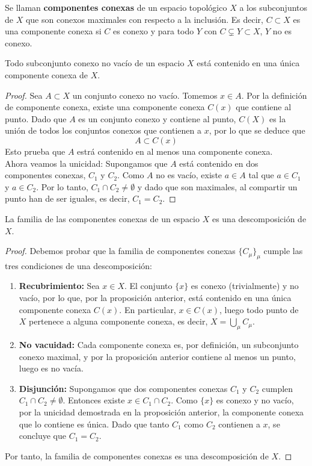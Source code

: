 \begin{definición}
    Se llaman \textbf{componentes conexas} de un espacio topológico $X$ a los subconjuntos de $X$ que son conexos maximales con respecto a la inclusión. Es decir, $C \subset X$ es una componente conexa si $C$ es conexo y para todo $Y$ con $C \subsetneq Y \subset X$, $Y$ no es conexo.
\end{definición}
\begin{proposición}
    Todo subconjunto conexo no vacío de un espacio $X$ está contenido en una única componente conexa de $X$.
\end{proposición}
\begin{proof}
    Sea $A \subset X$ un conjunto conexo no vacío. Tomemos $x \in A$. Por la definición de componente conexa, existe una componente conexa $C(x)$ que contiene al punto. Dado que $A$ es un conjunto conexo y contiene al punto, $C(X)$ es la unión de todos los conjuntos conexos que contienen a $x$, por lo que se deduce que
    $$A \subset C(x)$$
    Esto prueba que $A$ estrá contenido en al menos una componente conexa. \\
    Ahora veamos la unicidad: Supongamos que $A$ está contenido en dos componentes conexas, $C_1$ y $C_2$. Como $A$ no es vacío, existe $a \in A$ tal que $a \in C_1$ y $a \in C_2$. Por lo tanto, $C_1 \cap C_2 \neq \emptyset$ y dado que son maximales, al compartir un punto han de ser iguales, es decir, $C_1 = C_2$.
\end{proof}
\begin{corolario}
    La familia de las componentes conexas de un espacio $X$ es una descomposición de $X$.
\end{corolario}
\begin{proof}
    Debemos probar que la familia de componentes conexas $\{C_\mu\}_{\mu}$ cumple las tres condiciones de una descomposición:
    \begin{enumerate}
        \item \textbf{Recubrimiento:} Sea $x \in X$. El conjunto $\{x\}$ es conexo (trivialmente) y no vacío, por lo que, por la proposición anterior, está contenido en una única componente conexa $C(x)$. En particular, $x \in C(x)$, luego todo punto de $X$ pertenece a alguna componente conexa, es decir, $X = \bigcup_{\mu} C_\mu$.
        \item \textbf{No vacuidad:} Cada componente conexa es, por definición, un subconjunto conexo maximal, y por la proposición anterior contiene al menos un punto, luego es no vacía.
        \item \textbf{Disjunción:} Supongamos que dos componentes conexas $C_1$ y $C_2$ cumplen $C_1 \cap C_2 \neq \emptyset$. Entonces existe $x \in C_1 \cap C_2$. Como $\{x\}$ es conexo y no vacío, por la unicidad demostrada en la proposición anterior, la componente conexa que lo contiene es única. Dado que tanto $C_1$ como $C_2$ contienen a $x$, se concluye que $C_1 = C_2$.
    \end{enumerate}
    Por tanto, la familia de componentes conexas es una descomposición de $X$.
\end{proof}

